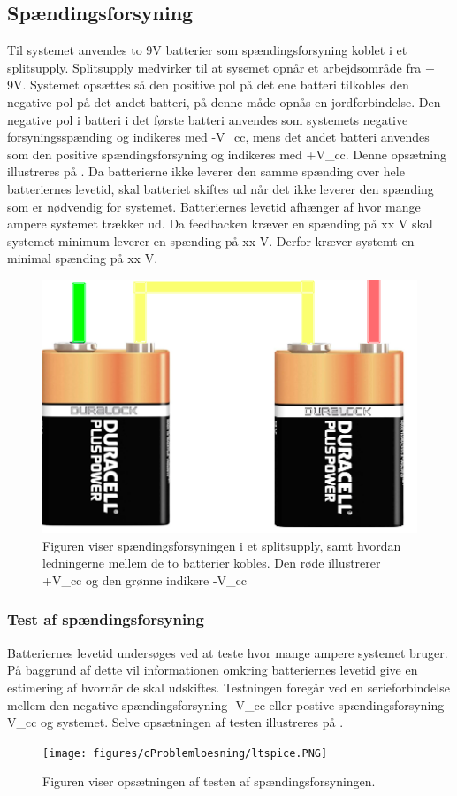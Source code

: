 \subsection{Spændingsforsyning}
Til systemet anvendes to 9V batterier som spændingsforsyning koblet i et splitsupply. Splitsupply medvirker til at sysemet opnår et arbejdsområde fra $\pm$ 9V. Systemet opsættes så den positive pol på det ene batteri tilkobles den negative pol på det andet batteri, på denne måde opnås en jordforbindelse. Den negative pol i batteri i det første batteri anvendes som systemets negative forsyningsspænding og indikeres med -V_cc, mens det andet batteri anvendes som den positive spændingsforsyning og indikeres med +V_cc. Denne opsætning illustreres på . 
Da batterierne ikke leverer den samme spænding over hele batteriernes levetid, skal batteriet skiftes ud når det ikke leverer den spænding som er nødvendig for systemet. Batteriernes levetid afhænger af hvor mange ampere systemet trækker ud. Da feedbacken kræver en spænding på xx V skal systemet minimum leverer en spænding på xx V. Derfor kræver systemt en minimal spænding på xx V.

\begin{figure}[H]
\centering
\includegraphics[scale=1]{figures/cProblemloesning/batteri.PNG}
\caption{Figuren viser spændingsforsyningen i et splitsupply, samt hvordan ledningerne mellem de to batterier kobles. Den røde illustrerer +V_cc og den grønne indikere -V_cc}
\label{fig:batteri}
\end{figure}

\subsubsection{Test af spændingsforsyning}
Batteriernes levetid undersøges ved at teste hvor mange ampere systemet bruger. På baggrund af dette vil informationen omkring batteriernes levetid give en estimering af hvornår de skal udskiftes. Testningen foregår ved en serieforbindelse mellem den negative spændingsforsyning- V_cc eller postive spændingsforsyning V_cc og systemet. Selve opsætningen af testen illustreres på .

\begin{figure}[H]
\centering
\texttt{[image: figures/cProblemloesning/ltspice.PNG]}
\caption{Figuren viser opsætningen af testen af spændingsforsyningen.}
\label{fig:spændingsforsyning}
\end{figure}